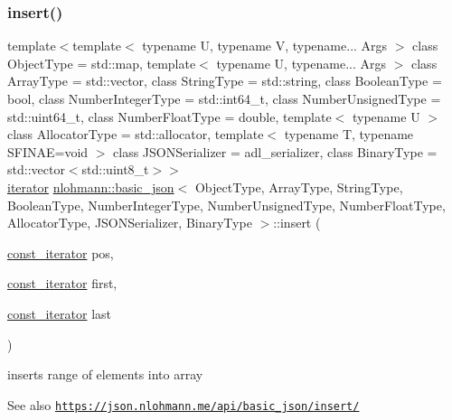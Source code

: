 \subsubsection{\texorpdfstring{insert()}{insert()}\hspace{0.1cm}{\footnotesize\ttfamily [4/6]}}
{\footnotesize\ttfamily template$<$template$<$ typename U, typename V, typename... Args $>$ class Object\+Type = std\+::map, template$<$ typename U, typename... Args $>$ class Array\+Type = std\+::vector, class String\+Type  = std\+::string, class Boolean\+Type  = bool, class Number\+Integer\+Type  = std\+::int64\+\_\+t, class Number\+Unsigned\+Type  = std\+::uint64\+\_\+t, class Number\+Float\+Type  = double, template$<$ typename U $>$ class Allocator\+Type = std\+::allocator, template$<$ typename T, typename S\+F\+I\+N\+A\+E=void $>$ class J\+S\+O\+N\+Serializer = adl\+\_\+serializer, class Binary\+Type  = std\+::vector$<$std\+::uint8\+\_\+t$>$$>$ \\
\hyperlink{classnlohmann_1_1basic__json_aa549b2b382916b3baafb526e5cb410bd}{iterator} \hyperlink{classnlohmann_1_1basic__json}{nlohmann\+::basic\+\_\+json}$<$ Object\+Type, Array\+Type, String\+Type, Boolean\+Type, Number\+Integer\+Type, Number\+Unsigned\+Type, Number\+Float\+Type, Allocator\+Type, J\+S\+O\+N\+Serializer, Binary\+Type $>$\+::insert (\begin{DoxyParamCaption}\item[{\hyperlink{classnlohmann_1_1basic__json_aebd2cfa7e4ded4e97cde9269bfeeea38}{const\+\_\+iterator}}]{pos,  }\item[{\hyperlink{classnlohmann_1_1basic__json_aebd2cfa7e4ded4e97cde9269bfeeea38}{const\+\_\+iterator}}]{first,  }\item[{\hyperlink{classnlohmann_1_1basic__json_aebd2cfa7e4ded4e97cde9269bfeeea38}{const\+\_\+iterator}}]{last }\end{DoxyParamCaption})\hspace{0.3cm}{\ttfamily [inline]}}



inserts range of elements into array 

\begin{DoxySeeAlso}{See also}
\href{https://json.nlohmann.me/api/basic_json/insert/}{\tt https\+://json.\+nlohmann.\+me/api/basic\+\_\+json/insert/} 
\end{DoxySeeAlso}
\mbox{\label{classnlohmann_1_1basic__json_a856b8764efd21dac4205a00fec82e09a}} 
